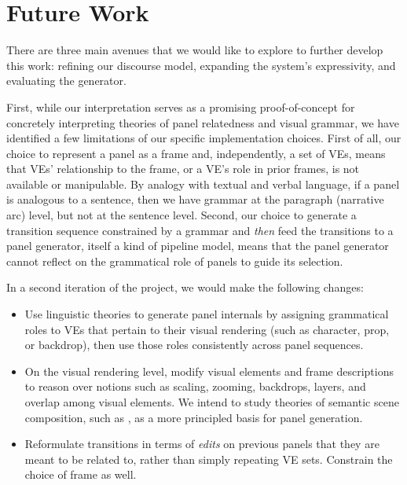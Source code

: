 \section{Future Work}

There are three main avenues that we would like to explore to further develop
this work: refining our discourse model, expanding the system's
expressivity, and evaluating the generator.

First, while our interpretation serves as a promising proof-of-concept for
concretely interpreting theories of panel relatedness and visual grammar,
we have identified a few limitations of our specific implementation
choices.  First of all, our choice to represent a panel as a frame and,
independently, a set of VEs, means that VEs' relationship to the frame, or
a VE's role in prior frames, is not available or manipulable.  By analogy
with textual and verbal language, if a panel is analogous to a sentence,
then we have grammar at the paragraph (narrative arc) level, but not at
the sentence level.  Second, our choice to generate a transition sequence
constrained by a grammar and {\em then} feed the transitions to a panel
generator, itself a kind of pipeline model, means that the panel generator
cannot reflect on the grammatical role of panels to guide its selection.

In a second iteration of the project, we would make the following changes:
\begin{itemize}
\item Use linguistic theories to generate panel internals by assigning
grammatical roles to VEs that pertain to their visual rendering (such as
character, prop, or backdrop), then use those roles consistently across
panel sequences.
\item On the visual rendering level, modify visual elements and frame
descriptions to reason over notions such as scaling, zooming, backdrops,
layers, and overlap among visual elements. We intend to study theories of
semantic scene composition, such as \cite{zitnick2013bringing}, as a more
principled basis for panel generation.
\item Reformulate transitions in terms of {\em edits} on previous panels
that they are meant to be related to, rather than simply repeating VE sets.
Constrain the choice of frame as well.
\end{itemize}

